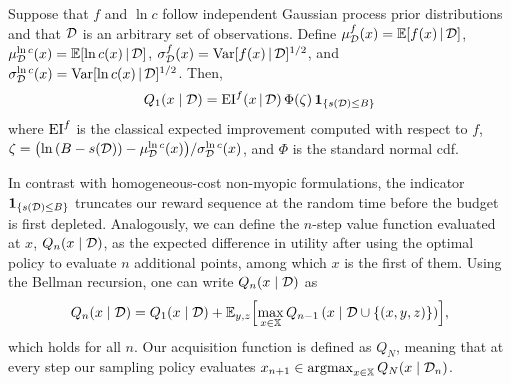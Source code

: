 \begin{proposition}
\label{prop:bcei}
Suppose that $f$ and $\ln c$ follow independent Gaussian process prior distributions and that $\mathcal{D}$ is an arbitrary set of observations. Define $\mu^f_{\mathcal{D}}(x) = \mathbb{E}[ f(x) \,|\, \mathcal{D}]$, $\mu^{\ln c}_{\mathcal{D}}(x) = \mathbb{E}[ \ln c(x) \,|\, \mathcal{D}]$, $\sigma^f_{\mathcal{D}}(x) = \textnormal{Var}[ f(x) \,|\, \mathcal{D}]^{1/2}$, and $\sigma^{\ln c}_{\mathcal{D}}(x) = \textnormal{Var}[ \ln c(x) \,|\, \mathcal{D}]^{1/2}$. Then,
\begin{equation*}
    Q_1(x\mid \mathcal{D}) = \mathrm{EI}^{f}(x\,|\,\mathcal{D}) \, \Phi(\zeta)\, \mathbf{1}_{\{s(\mathcal{D}) \le B\}} 
\end{equation*}
where $\textnormal{EI}^f$ is the classical expected improvement computed with respect to $f$, $\zeta = \bigl(\ln\left(B - s(\mathcal{D})\right) - \mu^{\ln c}_{\mathcal{D}}(x)\bigr) / \sigma^{\ln c}_{\mathcal{D}}(x)$, 
and $\Phi$ is the standard normal cdf.
\end{proposition}

In contrast with homogeneous-cost non-myopic formulations, the indicator $\mathbf{1}_{\{s(\mathcal{D})\le B\}}$ truncates our reward sequence at the random time before the budget is first depleted. Analogously, we can define the $n$-step value function evaluated at $x$, $Q_n(x\mid \mathcal{D})$, as the expected difference in utility after using the optimal policy to evaluate $n$ additional points, among which $x$ is the first of them. Using the Bellman recursion, one can write $Q_{n}(x\mid\mathcal{D})$ as
\begin{align*}
    Q_{n}(x\mid\mathcal{D}) =  Q_1(x\mid \mathcal{D}) + \mathbb{E}_{y,z}\Bigl[\max_{x\in\mathbb{X}}Q_{n-1}\left(x\mid \mathcal{D} \cup \{(x, y, z)\}\right)\Bigr],
\end{align*}
which holds for all $n$. Our acquisition function \BMSEI{} is defined as $Q_N$, meaning that at every step our sampling policy evaluates $x_{n+1} \in \operatorname*{argmax}_{x\in\mathbb{X}} Q_N(x \mid \mathcal{D}_n)$.

